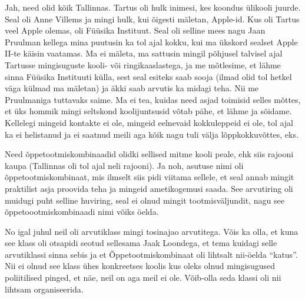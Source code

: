 Jah, need olid kõik Tallinnas. Tartus oli hulk inimesi, kes koondus ülikooli 
juurde. Seal oli Anne Villems ja mingi hulk, kui 
õigesti mäletan,  Apple-id. Kus oli Tartus veel Apple olemas, oli Füüsika 
Instituut. Seal oli selline mees nagu Jaan 
Pruulman kellega mina puutusin ka tol ajal  kokku, 
kui  ma ükskord sealset Apple II-te käisin vaatamas. Ma ei 
mäleta, ma sattusin mingil põhjusel talvisel ajal Tartusse mingisuguste kooli- või 
ringikaaslastega, ja  me mõtlesime, et lähme sinna Füüsika Instituuti külla, 
sest seal esiteks saab sooja (ilmad olid tol hetkel väga külmad ma mäletan) ja 
äkki saab arvutis ka midagi teha. Nii me Pruulmaniga tuttavaks saime. Ma ei 
tea, kuidas need asjad toimisid selles mõttes, et üks hommik mingi seltskond 
koolijuntsusid võtab pähe, et lähme ja sõidame. Kellelegi mingeid kontakte ei 
ole, mingeid eelnevaid kokkuleppeid ei ole, tol ajal ka ei helistanud ja ei saatnud 
meili aga kõik nagu tuli välja lõppkokkuvõttes, eks.

\label{content!OTK}

Need õppetootmiskombinaadid olidki sellised mitme kooli peale, ehk siis rajooni 
kaupa (Tallinnas oli tol ajal neli rajooni). 
Ja noh, asutuse nimi oli õppetootmiskombinaat, mis ilmselt siis pidi viitama 
sellele, et seal annab mingit praktilist asja proovida teha ja mingeid 
ametikogemusi saada. See arvutiring oli muidugi puht selline huviring, seal ei 
olnud mingit  tootmisväljundit, nagu see õppetoootmiskombinaadi nimi võiks 
öelda.


No igal juhul neil oli arvutiklass mingi tosinajao arvutitega. Võis ka olla, et 
kuna see klass oli otsapidi seotud sellesama Jaak Loondega, et tema kuidagi selle arvutiklassi sinna sebis ja et 
Õppetootmiskombinaat oli lihtsalt nii-öelda \enquote{katus}. Nii  ei olnud see 
klass ühes konkreetses koolis kus oleks olnud mingisugused poliitilised pinged, 
et näe, neil on aga meil ei ole. Võib-olla seda klassi oli nii lihtsam 
organiseerida. 


